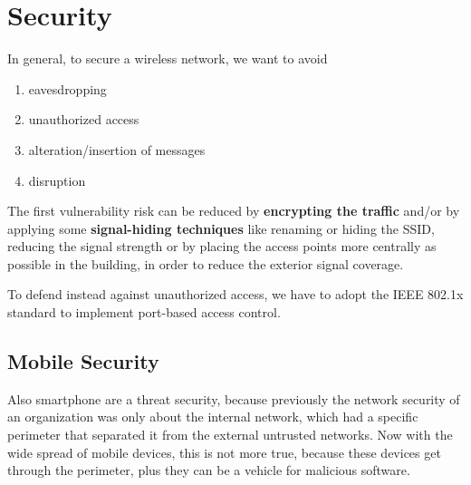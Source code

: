 \documentclass[oneside]{academica}
\begin{document}
\section{Security}

In general, to secure a wireless network, we want to avoid
\begin{enumerate}
  \item eavesdropping
  \item unauthorized access
  \item alteration/insertion of messages
  \item disruption
\end{enumerate}

The first vulnerability risk can be reduced by \textbf{encrypting the traffic} and/or by applying some \textbf{signal-hiding techniques} like renaming or hiding the SSID, reducing the signal strength or by placing the access points more centrally as possible in the building, in order to reduce the exterior signal coverage.

To defend instead against unauthorized access, we have to adopt the IEEE 802.1x standard to implement port-based access control.

\subsection{Mobile Security}

Also smartphone are a threat security, because previously the network security of an organization was only about the internal network, which had a specific perimeter that separated it from the external untrusted networks.
Now with the wide spread of mobile devices, this is not more true, because these devices get through the perimeter, plus they can be a vehicle for malicious software.
\end{document}
